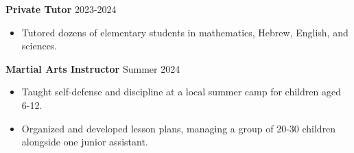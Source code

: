 \documentclass[11pt, a4paper]{article}
\begin{document}
\begin{english}
\noindent \textbf{Private Tutor} \hfill 2023-2024
\begin{itemize}[itemsep=2pt, parsep=0pt, topsep=2pt]
    \item Tutored dozens of elementary students in mathematics, Hebrew, English, and sciences.
\end{itemize}

\vspace{5pt}
\noindent \textbf{Martial Arts Instructor} \hfill Summer 2024
\begin{itemize}[itemsep=2pt, parsep=0pt, topsep=2pt]
    \item Taught self-defense and discipline at a local summer camp for children aged 6-12.
    \item Organized and developed lesson plans, managing a group of 20-30 children alongside one junior assistant.
\end{itemize}

\end{english}
\end{document}
